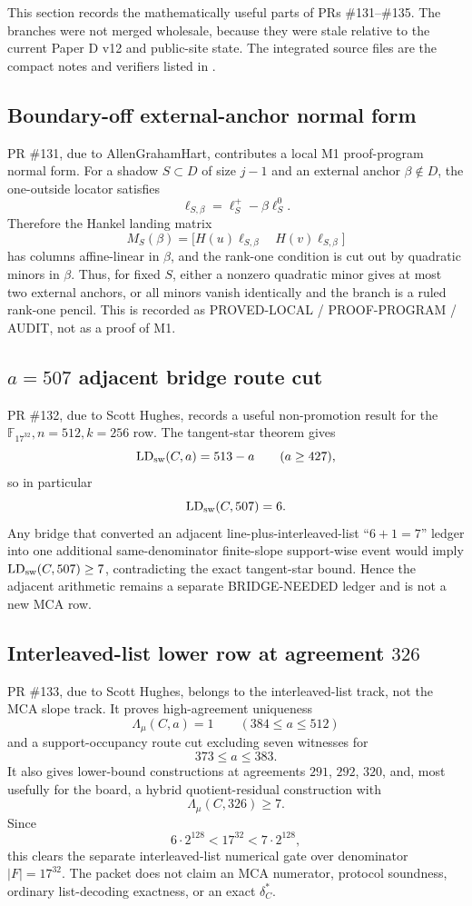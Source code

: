 \documentclass[11pt]{article}
\newcommand{\F}{\mathbb F}
\begin{document}
This section records the mathematically useful parts of PRs \#131--\#135.  The
branches were not merged wholesale, because they were stale relative to the
current Paper D v12 and public-site state.  The integrated source files are the
compact notes and verifiers listed in
.

\subsection{Boundary-off external-anchor normal form}

PR \#131, due to AllenGrahamHart, contributes a local M1 proof-program normal
form.  For a shadow \(S\subset D\) of size \(j-1\) and an external anchor
\(\beta\notin D\), the one-outside locator satisfies
\[
  \ell_{S,\beta}=\ell_S^+-\beta\ell_S^0 .
\]
Therefore the Hankel landing matrix
\[
  M_S(\beta)=
  \bigl[H(u)\ell_{S,\beta}\quad H(v)\ell_{S,\beta}\bigr]
\]
has columns affine-linear in \(\beta\), and the rank-one condition is cut out
by quadratic minors in \(\beta\).  Thus, for fixed \(S\), either a nonzero
quadratic minor gives at most two external anchors, or all minors vanish
identically and the branch is a ruled rank-one pencil.  This is recorded as
PROVED-LOCAL / PROOF-PROGRAM / AUDIT, not as a proof of M1.

\subsection{\(a=507\) adjacent bridge route cut}

PR \#132, due to Scott Hughes, records a useful non-promotion result for the
\(\F_{17^{32}},n=512,k=256\) row.  The tangent-star theorem gives
\[
  \operatorname{LD}_{\rm sw}(C,a)=513-a
  \qquad (a\ge427),
\]
so in particular
\[
  \operatorname{LD}_{\rm sw}(C,507)=6.
\]
Any bridge that converted an adjacent line-plus-interleaved-list
``\(6+1=7\)'' ledger into one additional same-denominator finite-slope
support-wise event would imply
\(\operatorname{LD}_{\rm sw}(C,507)\ge7\), contradicting the exact
tangent-star bound.  Hence the adjacent arithmetic remains a separate
BRIDGE-NEEDED ledger and is not a new MCA row.

\subsection{Interleaved-list lower row at agreement \(326\)}

PR \#133, due to Scott Hughes, belongs to the interleaved-list track, not the
MCA slope track.  It proves high-agreement uniqueness
\[
  \Lambda_\mu(C,a)=1\qquad (384\le a\le512)
\]
and a support-occupancy route cut excluding seven witnesses for
\[
  373\le a\le383.
\]
It also gives lower-bound constructions at agreements \(291\), \(292\), \(320\),
and, most usefully for the board, a hybrid quotient-residual construction with
\[
  \Lambda_\mu(C,326)\ge7 .
\]
Since
\[
  6\cdot2^{128}<17^{32}<7\cdot2^{128},
\]
this clears the separate interleaved-list numerical gate over denominator
\(|F|=17^{32}\).  The packet does not claim an MCA numerator, protocol
soundness, ordinary list-decoding exactness, or an exact \(\delta_C^*\).
\end{document}
